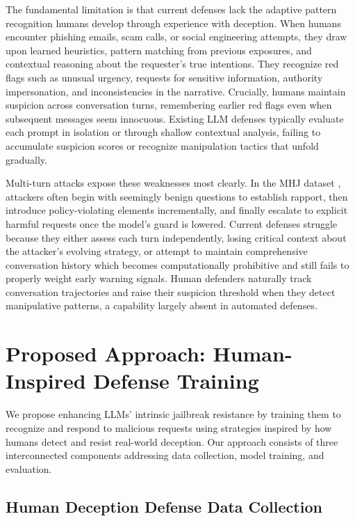 The fundamental limitation is that current defenses lack the adaptive pattern recognition humans develop through experience with deception. When humans encounter phishing emails, scam calls, or social engineering attempts, they draw upon learned heuristics, pattern matching from previous exposures, and contextual reasoning about the requester's true intentions. They recognize red flags such as unusual urgency, requests for sensitive information, authority impersonation, and inconsistencies in the narrative. Crucially, humans maintain suspicion across conversation turns, remembering earlier red flags even when subsequent messages seem innocuous. Existing LLM defenses typically evaluate each prompt in isolation or through shallow contextual analysis, failing to accumulate suspicion scores or recognize manipulation tactics that unfold gradually.

Multi-turn attacks expose these weaknesses most clearly. In the MHJ dataset \cite{mhj}, attackers often begin with seemingly benign questions to establish rapport, then introduce policy-violating elements incrementally, and finally escalate to explicit harmful requests once the model's guard is lowered. Current defenses struggle because they either assess each turn independently, losing critical context about the attacker's evolving strategy, or attempt to maintain comprehensive conversation history which becomes computationally prohibitive and still fails to properly weight early warning signals. Human defenders naturally track conversation trajectories and raise their suspicion threshold when they detect manipulative patterns, a capability largely absent in automated defenses.

\section{Proposed Approach: Human-Inspired Defense Training}

We propose enhancing LLMs' intrinsic jailbreak resistance by training them to recognize and respond to malicious requests using strategies inspired by how humans detect and resist real-world deception. Our approach consists of three interconnected components addressing data collection, model training, and evaluation.

\subsection{Human Deception Defense Data Collection}

